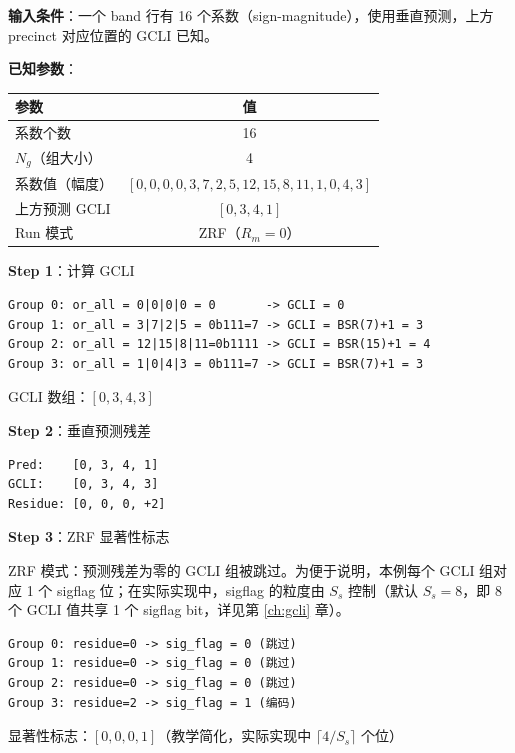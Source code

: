 \begin{examplebox}[title={例 2：GCLI 编码全流程}]

\textbf{输入条件}：一个 band 行有 16 个系数（sign-magnitude），使用垂直预测，上方 precinct 对应位置的 GCLI 已知。

\medskip
\textbf{已知参数}：

\begin{tabular}{@{}lc@{}}
\toprule
参数 & 值 \\
\midrule
系数个数 & 16 \\
$N_g$（组大小） & 4 \\
系数值（幅度） & $[0, 0, 0, 0, 3, 7, 2, 5, 12, 15, 8, 11, 1, 0, 4, 3]$ \\
上方预测 GCLI & $[0, 3, 4, 1]$ \\
Run 模式 & ZRF（$R_m = 0$） \\
\bottomrule
\end{tabular}

\medskip
\textbf{Step 1}：计算 GCLI

\begin{lstlisting}[numbers=none]
Group 0: or_all = 0|0|0|0 = 0       -> GCLI = 0
Group 1: or_all = 3|7|2|5 = 0b111=7 -> GCLI = BSR(7)+1 = 3
Group 2: or_all = 12|15|8|11=0b1111 -> GCLI = BSR(15)+1 = 4
Group 3: or_all = 1|0|4|3 = 0b111=7 -> GCLI = BSR(7)+1 = 3
\end{lstlisting}

GCLI 数组：$[0, 3, 4, 3]$

\textbf{Step 2}：垂直预测残差

\begin{lstlisting}[numbers=none]
Pred:    [0, 3, 4, 1]
GCLI:    [0, 3, 4, 3]
Residue: [0, 0, 0, +2]
\end{lstlisting}

\textbf{Step 3}：ZRF 显著性标志

ZRF 模式：预测残差为零的 GCLI 组被跳过。为便于说明，本例每个 GCLI 组对应 1 个 sigflag 位；在实际实现中，sigflag 的粒度由 $S_s$ 控制（默认 $S_s=8$，即 8 个 GCLI 值共享 1 个 sigflag bit，详见第 \ref{ch:gcli} 章）。

\begin{lstlisting}[numbers=none]
Group 0: residue=0 -> sig_flag = 0 (跳过)
Group 1: residue=0 -> sig_flag = 0 (跳过)
Group 2: residue=0 -> sig_flag = 0 (跳过)
Group 3: residue=2 -> sig_flag = 1 (编码)
\end{lstlisting}

显著性标志：$[0, 0, 0, 1]$（教学简化，实际实现中 $\lceil4/S_s\rceil$ 个位）


\end{examplebox}
